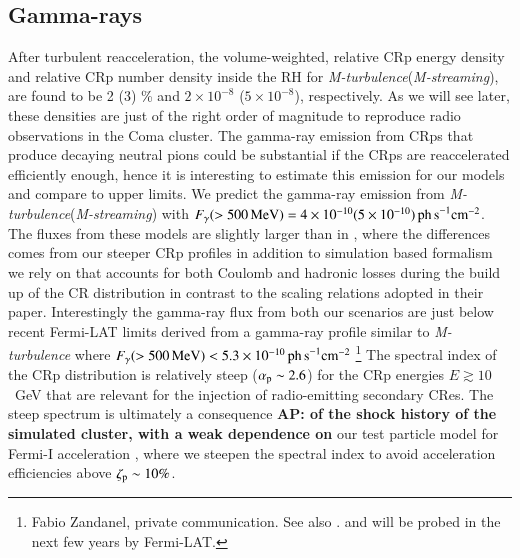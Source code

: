 \documentclass[useAMS,usenatbib]{mn2e}
\newcommand{\Mstream}{{\it M-streaming}\xspace}
\newcommand{\Mflatturb}{{\it M-turbulence}\xspace}
\def\AP#1{{\bf  AP: #1}}
\begin{document}
\subsection{Gamma-rays}
After turbulent reacceleration, the volume-weighted, relative CRp
energy density and relative CRp number density inside the RH for
\Mflatturb (\Mstream), are found to be 2 (3) \% and $2\times10^{-8}$
($5\times10^{-8}$), respectively. As we will see later, these
densities are just of the right order of magnitude to reproduce radio
observations in the Coma cluster. The gamma-ray emission from CRps
that produce decaying neutral pions could be substantial if the CRps
are reaccelerated efficiently enough, hence it is interesting to
estimate this emission for our models and compare to upper limits. We
predict the gamma-ray emission from \Mflatturb (\Mstream) with
$F_\gamma(>500\,{\mathrm{MeV}})=4\times10^{-10} (5\times10^{-10}) \mathrm{
  \,ph\, s}^{-1}\mathrm{cm}^{-2}$. The fluxes from these models are
slightly larger than in \cite{brunetti12}, where the differences comes
from our steeper CRp profiles in addition to simulation based
formalism we rely on that accounts for both Coulomb and hadronic
losses during the build up of the CR distribution in contrast to the
scaling relations adopted in their paper. Interestingly the gamma-ray
flux from both our scenarios are just below recent Fermi-LAT limits
derived from a gamma-ray profile similar to \Mflatturb where
$F_\gamma(>500\,{\mathrm{MeV}})<5.3\times10^{-10} \mathrm{ \,ph\,
  s}^{-1}\mathrm{cm}^{-2}$ \footnote{Fabio Zandanel, private
  communication. See also
  \citet{2014MNRAS.440..663Z,2014ApJ...787...18A}. and will be probed
  in the next few years by Fermi-LAT. } The spectral index of the CRp
distribution is relatively steep ($\alpha_{{\mathrm{p}}}\sim2.6$) for the
CRp energies $E \gtrsim 10$~GeV that are relevant for the injection of
radio-emitting secondary CRes. The steep spectrum is ultimately a
consequence \AP{of the shock history of the simulated cluster, with a
  weak dependence on} our test particle model for Fermi-I acceleration
\citep{pinzke13}, where we steepen the spectral index to avoid
acceleration efficiencies above $\zeta_{{\mathrm{p}}} \sim 10\%$.
\end{document}
